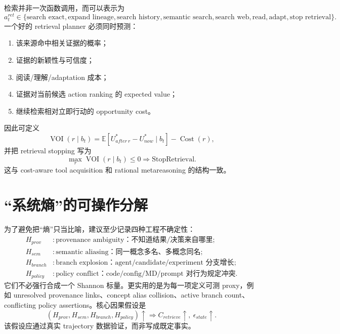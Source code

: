 \documentclass[11pt,a4paper]{ctexart}
\newcommand{\E}{\mathbb{E}}
\newcommand{\Cost}{\operatorname{Cost}}
\newcommand{\VOI}{\operatorname{VOI}}
\begin{document}
检索并非一次函数调用，而可以表示为
\begin{equation}
 a_t^{ret}\in\{\text{search exact},\text{expand lineage},\text{search history},\text{semantic search},\text{search web},\text{read},\text{adapt},\text{stop retrieval}\}.
\end{equation}
一个好的 retrieval planner 必须同时预测：
\begin{enumerate}
\item 该来源命中相关证据的概率；
\item 证据的新颖性与可信度；
\item 阅读/理解/adaptation 成本；
\item 证据对当前候选 action ranking 的 expected value；
\item 继续检索相对立即行动的 opportunity cost。
\end{enumerate}

因此可定义
\begin{equation}
 \VOI(r\mid b_t)=\E[U^*_{after\ r}-U^*_{now}\mid b_t]-\Cost(r),
\end{equation}
并把 retrieval stopping 写为
\begin{equation}
 \max_r\VOI(r\mid b_t)\le 0\Rightarrow \text{StopRetrieval}.
\end{equation}
这与 cost-aware tool acquisition 和 rational metareasoning 的结构一致\parencite{feng2026camdf,russell1991metareasoning}。

\section{“系统熵”的可操作分解}

为了避免把“熵”只当比喻，建议至少记录四种工程不确定性：
\begin{align}
H_{prov} &: \text{provenance ambiguity：不知道结果/决策来自哪里};\\
H_{sem} &: \text{semantic aliasing：同一概念多名、多概念同名};\\
H_{branch} &: \text{branch explosion：agent/candidate/experiment 分支增长};\\
H_{policy} &: \text{policy conflict：code/config/MD/prompt 对行为规定冲突}.
\end{align}
它们不必强行合成一个 Shannon 标量。更实用的是为每一项定义可测 proxy，例如 unresolved provenance links、concept alias collision、active branch count、conflicting policy assertions。核心因果假设是
\begin{equation}
(H_{prov},H_{sem},H_{branch},H_{policy})\uparrow
\Rightarrow C_{retrieve}\uparrow,\ \epsilon_{state}\uparrow.
\end{equation}
该假设应通过真实 trajectory 数据验证，而非写成既定事实。
\end{document}
